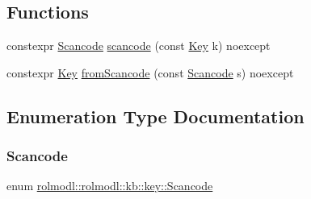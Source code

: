 \subsection*{Functions}
\begin{DoxyCompactItemize}
\item 
constexpr \mbox{\hyperlink{namespacerolmodl_1_1rolmodl_1_1kb_1_1key_af2e2c19a7e4c7347383cae496d850490}{Scancode}} \mbox{\hyperlink{namespacerolmodl_1_1rolmodl_1_1kb_1_1key_a4890bd2c8b69ca02d50c50f7ffa1b90e}{scancode}} (const \mbox{\hyperlink{namespacerolmodl_1_1rolmodl_1_1kb_a188e00b289aeb95ae45fb6bf2923e7e2}{Key}} k) noexcept
\item 
constexpr \mbox{\hyperlink{namespacerolmodl_1_1rolmodl_1_1kb_a188e00b289aeb95ae45fb6bf2923e7e2}{Key}} \mbox{\hyperlink{namespacerolmodl_1_1rolmodl_1_1kb_1_1key_a3d3f1cf2e02dcb99a3fbd50936d04dbb}{from\+Scancode}} (const \mbox{\hyperlink{namespacerolmodl_1_1rolmodl_1_1kb_1_1key_af2e2c19a7e4c7347383cae496d850490}{Scancode}} s) noexcept
\end{DoxyCompactItemize}


\subsection{Enumeration Type Documentation}
\mbox{\label{namespacerolmodl_1_1rolmodl_1_1kb_1_1key_af2e2c19a7e4c7347383cae496d850490}} 
\subsubsection{\texorpdfstring{Scancode}{Scancode}}
{\footnotesize\ttfamily enum \mbox{\hyperlink{namespacerolmodl_1_1rolmodl_1_1kb_1_1key_af2e2c19a7e4c7347383cae496d850490}{rolmodl\+::rolmodl\+::kb\+::key\+::\+Scancode}}\hspace{0.3cm}{\ttfamily [strong]}}

